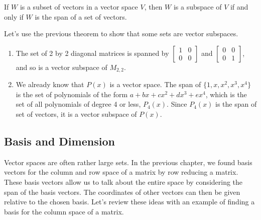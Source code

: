 \begin{theorem}\label{thm subspace iff span}
If $W$ is a subset of vectors in a vector space $V$, then $W$ is a subspace of $V$ if and only if $W$ is the span of a set of vectors.
\end{theorem}


\begin{example}
Let's use the previous theorem to show that some sets are vector subspaces. 
\begin{enumerate}
	\item The set of 2 by 2 diagonal matrices is spanned by 
	$\begin{bmatrix}1&0\\0&0\end{bmatrix}$ and $\begin{bmatrix}0&0\\0&1\end{bmatrix}$, and so is a vector subspace of $M_{2,2}$.
	\item We already know that $P(x)$ is a vector space. The span of $\{1,x,x^2,x^3,x^4\}$ is the set of polynomials of the form $a+bx+cx^2+dx^3+ex^4$, which is the set of all polynomials of degree 4 or less, $P_4(x)$. Since $P_4(x)$ is the span of set of vectors, it is a vector subspace of $P(x)$. 
\end{enumerate}
\end{example}



\subsection{Basis and Dimension}
Vector spaces are often rather large sets. In the previous chapter, we found basis vectors for the column and row space of a matrix by row reducing a matrix. These basis vectors allow us to talk about the entire space by considering the span of the basis vectors. The coordinates of other vectors can then be given relative to the chosen basis. Let's review these ideas with an example of finding a basis for the column space of a matrix.

